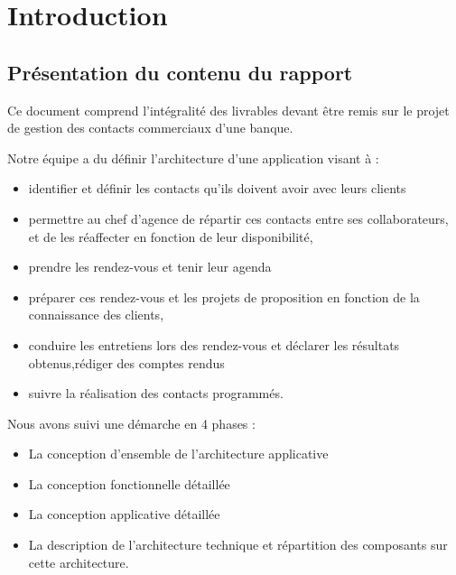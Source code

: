 





\tableofcontents
{%
\let\oldnumberline\numberline%
\renewcommand{\numberline}{\figurename~\oldnumberline}%
\renewcommand\listfigurename{Liste des figures}
\listoffigures%
}
{%
\let\oldnumberline\numberline%
\renewcommand{\numberline}{\tablename~\oldnumberline}%
\renewcommand\listtablename{Liste des tableaux}
\listoftables%
}

\newpage
{}
\chapter*{Introduction}
\section*{Présentation du contenu du rapport}
Ce document comprend l'intégralité des livrables devant être remis sur le projet de gestion des contacts commerciaux d'une banque. 

Notre équipe a du définir l'architecture d'une application visant à : \\
\begin{itemize}
\item identifier et définir les contacts qu’ils doivent avoir avec leurs clients
\item permettre au chef d’agence de répartir ces contacts entre ses collaborateurs, et de les réaffecter en fonction de leur disponibilité,
\item prendre les rendez-vous et tenir leur agenda
\item préparer ces rendez-vous et les projets de proposition en fonction de la connaissance des
clients,
\item conduire les entretiens lors des rendez-vous et déclarer les résultats obtenus,rédiger des comptes rendus
\item suivre la réalisation des contacts programmés.\\

\end{itemize}


Nous avons suivi une démarche en 4 phases : 
\begin{itemize}
\item La conception d’ensemble de l’architecture applicative
\item La conception fonctionnelle détaillée
\item La conception applicative détaillée
\item La description de l’architecture technique et répartition des composants sur cette
architecture.\\
\end{itemize}

